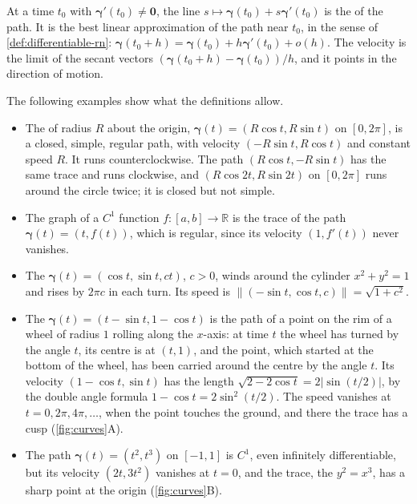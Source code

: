 At a time $t_0$ with $\boldsymbol\gamma'(t_0)\ne\mathbf0$, the line $s\mapsto\boldsymbol\gamma(t_0)+s\boldsymbol\gamma'(t_0)$ is the  of the path. It is the best linear approximation of the path near $t_0$, in the sense of \cref{def:differentiable-rn}: $\boldsymbol\gamma(t_0+h)=\boldsymbol\gamma(t_0)+h\boldsymbol\gamma'(t_0)+o(h)$. The velocity is the limit of the secant vectors $(\boldsymbol\gamma(t_0+h)-\boldsymbol\gamma(t_0))/h$, and it points in the direction of motion.

The following examples show what the definitions allow.
\begin{itemize}
\item The  of radius $R$ about the origin, $\boldsymbol\gamma(t)=(R\cos t,R\sin t)$ on $[0,2\pi]$, is a closed, simple, regular path, with velocity $(-R\sin t,R\cos t)$ and constant speed $R$. It runs counterclockwise. The path $(R\cos t,-R\sin t)$ has the same trace and runs clockwise, and $(R\cos2t,R\sin2t)$ on $[0,2\pi]$ runs around the circle twice; it is closed but not simple.
\item The graph of a $C^1$ function $f\colon[a,b]\to\mathbb R$ is the trace of the path $\boldsymbol\gamma(t)=(t,f(t))$, which is regular, since its velocity $(1,f'(t))$ never vanishes.
\item The  $\boldsymbol\gamma(t)=(\cos t,\sin t,ct)$, $c>0$, winds around the cylinder $x^2+y^2=1$ and rises by $2\pi c$ in each turn. Its speed is $\|(-\sin t,\cos t,c)\|=\sqrt{1+c^2}$.
\item The  $\boldsymbol\gamma(t)=(t-\sin t,1-\cos t)$ is the path of a point on the rim of a wheel of radius $1$ rolling along the $x$-axis: at time $t$ the wheel has turned by the angle $t$, its centre is at $(t,1)$, and the point, which started at the bottom of the wheel, has been carried around the centre by the angle $t$. Its velocity $(1-\cos t,\sin t)$ has the length $\sqrt{2-2\cos t}=2|\sin(t/2)|$, by the double angle formula $1-\cos t=2\sin^2(t/2)$. The speed vanishes at $t=0,2\pi,4\pi,\ldots$, when the point touches the ground, and there the trace has a cusp (\cref{fig:curves}A).
\item The path $\boldsymbol\gamma(t)=(t^2,t^3)$ on $[-1,1]$ is $C^1$, even infinitely differentiable, but its velocity $(2t,3t^2)$ vanishes at $t=0$, and the trace, the  $y^2=x^3$, has a sharp point at the origin (\cref{fig:curves}B).
\end{itemize}

